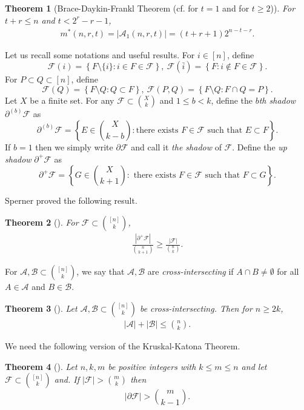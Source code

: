 \documentclass[11pt,a4paper]{article}
\newtheorem{thm}{Theorem}[section]
\newtheorem{false statement}{False statement}
\theoremstyle{definition}
\def\hf{\mathcal{F}}
\def\ha{\mathcal{A}}
\def\hb{\mathcal{B}}
\begin{document}
\begin{thm}[Brace-Daykin-Frankl Theorem (cf. \cite{BD} for $t=1$ and \cite{F91} for $t\geq 2$)]\label{thm-bd}
For $t+r\leq n$ and  $t<2^r-r-1$,
\begin{align}\label{ineq-1.5}
m^*(n,r,t)= |\ha_1(n,r,t)| =(t+r+1) 2^{n-t-r}.
\end{align}
\end{thm}

Let us recall some notations and useful results.
For $i\in [n]$, define
\[
\hf(i) =\left\{F\setminus \{i\}\colon i\in F\in \hf\right\},\ \hf(\bar{i}) = \left\{F\colon i\notin F\in \hf\right\}.
\]
For $P\subset Q\subset [n]$, define
\[
\hf(Q)= \left\{F\setminus Q\colon Q\subset F\right\},\ \hf(P,Q)= \left\{F\setminus Q\colon  F\cap Q=P\right\}.
\]
Let $X$ be a finite set. 
For any $\hf\subset \binom{X}{k}$ and $1\leq b< k$, define the {\it $b$th shadow}  $\partial^{(b)} \hf$ as
\[
\partial^{(b)} \hf =\left\{E\in \binom{X}{k-b}\colon \mbox{there exists }F\in \hf \mbox{ such that }E\subset F\right\}.
\]
If $b=1$ then we simply write $\partial \hf$ and call it {\it the shadow} of $\hf$.
Define the {\it up shadow} $\partial^+ \hf$  as
\[
\partial^+ \hf =\left\{G\in \binom{X}{k+1}\colon \mbox{ there exists } F\in \hf \mbox{ such that  }F\subset G\right\}.
\]

Sperner  \cite{Sperner} proved the following result.
 
\begin{thm}[\cite{Sperner}]\label{thm-sperner}
 For $\hf\subset \binom{[n]}{k}$,
\begin{align}\label{ineq-sperner}
\frac{|\partial^+ \hf|}{\binom{n}{k+1}} \geq \frac{|\hf|}{\binom{n}{k}}.
\end{align}
\end{thm}

For $\ha,\hb\subset \binom{[n]}{k}$, we say that $\ha,\hb$ are {\it cross-intersecting} if $A\cap B\neq \emptyset$ for all $A\in \ha$ and $B\in \hb$. 

\begin{thm}[\cite{Hilton}]
Let $\ha,\hb\subset \binom{[n]}{k}$ be cross-intersecting. Then for $n\geq 2k$,
\begin{align}\label{ineq-1.7}
|\ha|+|\hb| \leq \binom{n}{k}.
\end{align}
\end{thm} 

We need the following version of the Kruskal-Katona Theorem.

\begin{thm}[\cite{Kruskal,Katona}]\label{thm-kk}
Let $n,k,m$ be positive integers with $k\leq m\leq n$ and let $\hf \subset \binom{[n]}{k}$  and. If $|\hf|>\binom{m}{k}$  then
\[
|\partial \hf|>\binom{m}{k-1}.
\]
\end{thm}
\end{document}
